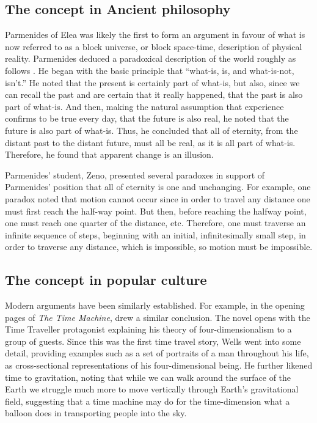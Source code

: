 \documentclass[aps,rmp,groupedaddress,twocolumn,10pt]{revtex4-2}
\begin{document}
\subsection{The concept in Ancient philosophy}

Parmenides of Elea was likely the first to form an argument in favour of what is now referred to as a block universe, or block space-time, description of physical reality. Parmenides deduced a paradoxical description of the world roughly as follows \cite{Gallow1984}. He began with the basic principle that ``what-is, is, and what-is-not, isn't.'' He noted that the present is certainly part of what-is, but also, since we can recall the past and are certain that it really happened, that the past is also part of what-is. And then, making the natural assumption that experience confirms to be true every day, that the future is also real, he noted that the future is also part of what-is. Thus, he concluded that all of eternity, from the distant past to the distant future, must all be real, as it is all part of what-is. Therefore, he found that apparent change is an illusion.

Parmenides' student, Zeno, presented several paradoxes in support of Parmenides' position that all of eternity is one and unchanging. For example, one paradox noted that motion cannot occur since in order to travel any distance one must first reach the half-way point. But then, before reaching the halfway point, one must reach one quarter of the distance, etc. Therefore, one must traverse an infinite sequence of steps, beginning with an initial, infinitesimally small step, in order to traverse any distance, which is impossible, so motion must be impossible.

\subsection{The concept in popular culture}

Modern arguments have been similarly established. For example, in the opening pages of \textit{The Time Machine}, \citet{Wells1895} drew a similar conclusion. The novel opens with the Time Traveller protagonist explaining his theory of four-dimensionalism to a group of guests. Since this was the first time travel story, Wells went into some detail, providing examples such as a set of portraits of a man throughout his life, as cross-sectional representations of his four-dimensional being. He further likened time to gravitation, noting that while we can walk around the surface of the Earth we struggle much more to move vertically through Earth's gravitational field, suggesting that a time machine may do for the time-dimension what a balloon does in transporting people into the sky.
\end{document}
